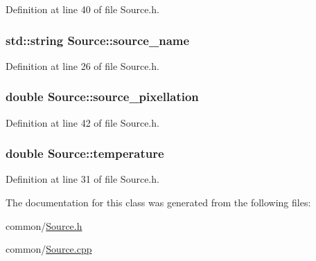 Definition at line 40 of file Source.h.

\hypertarget{classSource_aca080db4a19c5a8c149b6362aedcb0cd}{
\subsubsection[{source\_\-name}]{\setlength{\rightskip}{0pt plus 5cm}std::string {\bf Source::source\_\-name}}}
\label{classSource_aca080db4a19c5a8c149b6362aedcb0cd}


Definition at line 26 of file Source.h.

\hypertarget{classSource_ad8a9910f6a3d807ac0e1b42195ba4147}{
\subsubsection[{source\_\-pixellation}]{\setlength{\rightskip}{0pt plus 5cm}double {\bf Source::source\_\-pixellation}}}
\label{classSource_ad8a9910f6a3d807ac0e1b42195ba4147}


Definition at line 42 of file Source.h.

\hypertarget{classSource_a01ad608788eb4c0e4a7b2a6228398394}{
\subsubsection[{temperature}]{\setlength{\rightskip}{0pt plus 5cm}double {\bf Source::temperature}}}
\label{classSource_a01ad608788eb4c0e4a7b2a6228398394}


Definition at line 31 of file Source.h.



The documentation for this class was generated from the following files:\begin{DoxyCompactItemize}
\item 
common/\hyperlink{Source_8h}{Source.h}\item 
common/\hyperlink{Source_8cpp}{Source.cpp}\end{DoxyCompactItemize}
